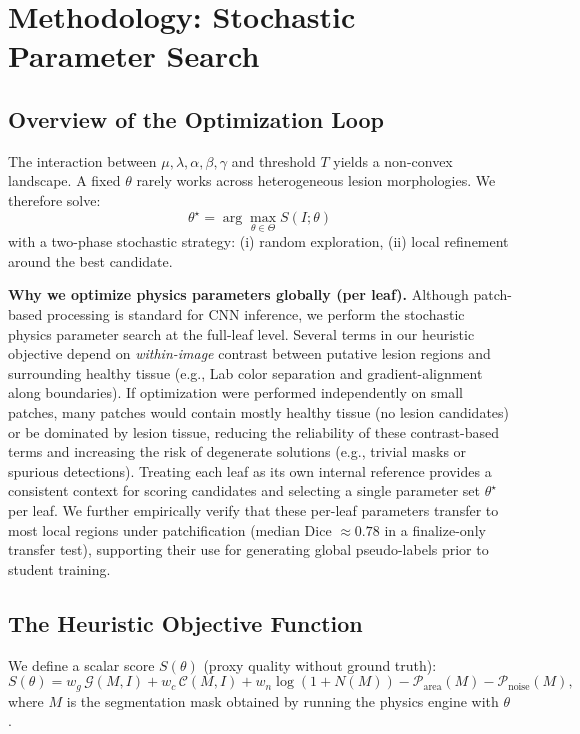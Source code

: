 \documentclass[journal]{IEEEtran}
\begin{document}
\section{Methodology: Stochastic Parameter Search}

\subsection{Overview of the Optimization Loop}
The interaction between $\mu,\lambda,\alpha,\beta,\gamma$ and threshold $T$ yields a non-convex landscape. A fixed $\theta$ rarely works across heterogeneous lesion morphologies. We therefore solve:
\begin{equation}
\theta^\star = \arg\max_{\theta\in\Theta} S(I;\theta)
\end{equation}
with a two-phase stochastic strategy: (i) random exploration, (ii) local refinement around the best candidate.

\textbf{Why we optimize physics parameters globally (per leaf).}
Although patch-based processing is standard for CNN inference, we perform the stochastic physics parameter search at the full-leaf level. Several terms in our heuristic objective depend on \emph{within-image} contrast between putative lesion regions and surrounding healthy tissue (e.g., Lab color separation and gradient-alignment along boundaries). If optimization were performed independently on small patches, many patches would contain mostly healthy tissue (no lesion candidates) or be dominated by lesion tissue, reducing the reliability of these contrast-based terms and increasing the risk of degenerate solutions (e.g., trivial masks or spurious detections). Treating each leaf as its own internal reference provides a consistent context for scoring candidates and selecting a single parameter set $\theta^\star$ per leaf. We further empirically verify that these per-leaf parameters transfer to most local regions under patchification (median Dice $\approx 0.78$ in a finalize-only transfer test), supporting their use for generating global pseudo-labels prior to student training.

\subsection{The Heuristic Objective Function}
\label{sec:objective}
We define a scalar score $S(\theta)$ (proxy quality without ground truth):
\begin{equation}
S(\theta) = w_g \,\mathcal{G}(M,I) + w_c \,\mathcal{C}(M,I) + w_n \log(1+N(M))
            - \mathcal{P}_{\mathrm{area}}(M) - \mathcal{P}_{\mathrm{noise}}(M),
\label{eq:objective}
\end{equation}
where $M$ is the segmentation mask obtained by running the physics engine with $\theta$.
\end{document}
